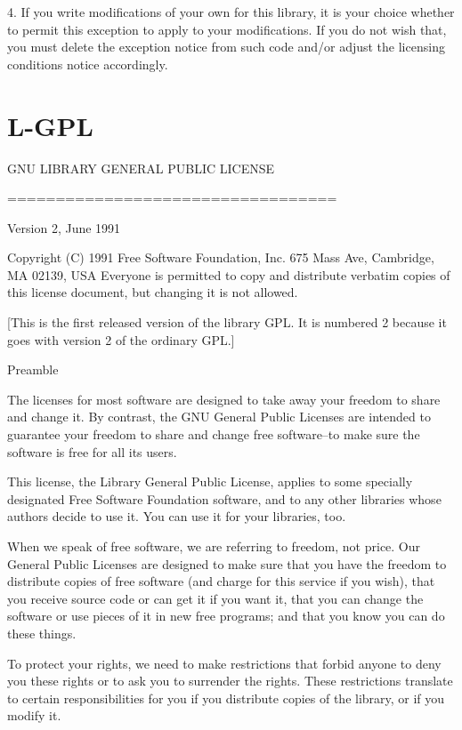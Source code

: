 \documentclass[twoside]{tceusermanual}
\begin{document}
4. If you write modifications of your own for this library, it is your
choice whether to permit this exception to apply to your modifications.
If you do not wish that, you must delete the exception notice from such
code and/or adjust the licensing conditions notice accordingly.

\section{L-GPL}

\begin{center}
	  GNU LIBRARY GENERAL PUBLIC LICENSE

	  ==================================

                Version 2, June 1991

 Copyright (C) 1991 Free Software Foundation, Inc.
                    675 Mass Ave, Cambridge, MA 02139, USA
 Everyone is permitted to copy and distribute verbatim copies
 of this license document, but changing it is not allowed.

[This is the first released version of the library GPL.  It is
 numbered 2 because it goes with version 2 of the ordinary GPL.]

Preamble
\end{center}

The licenses for most software are designed to take away your
freedom to share and change it.  By contrast, the GNU General
Public Licenses are intended to guarantee your freedom to share
and change free software--to make sure the software is free for
all its users.

This license, the Library General Public License, applies to
some specially designated Free Software Foundation software, and
to any other libraries whose authors decide to use it.  You can
use it for your libraries, too.

When we speak of free software, we are referring to freedom, not
price.  Our General Public Licenses are designed to make sure
that you have the freedom to distribute copies of free software
(and charge for this service if you wish), that you receive
source code or can get it if you want it, that you can change
the software or use pieces of it in new free programs; and that
you know you can do these things.

To protect your rights, we need to make restrictions that forbid
anyone to deny you these rights or to ask you to surrender the
rights. These restrictions translate to certain responsibilities
for you if you distribute copies of the library, or if you
modify it.
\end{document}
